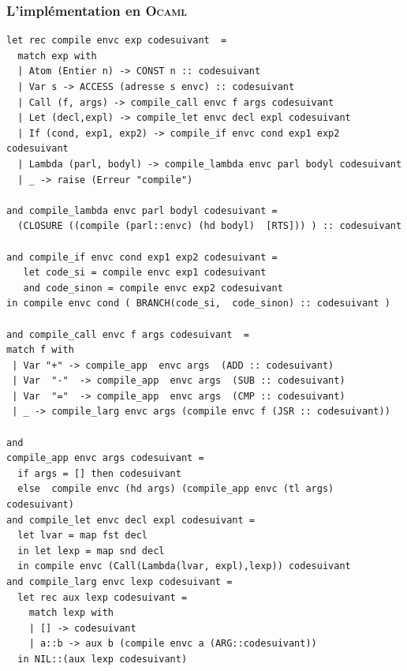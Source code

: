 \subsubsection{L'implémentation en \textsc{Ocaml}}

\begin{footnotesize}
\begin{Verbatim}
let rec compile envc exp codesuivant  =
  match exp with
  | Atom (Entier n) -> CONST n :: codesuivant
  | Var s -> ACCESS (adresse s envc) :: codesuivant
  | Call (f, args) -> compile_call envc f args codesuivant
  | Let (decl,expl) -> compile_let envc decl expl codesuivant 
  | If (cond, exp1, exp2) -> compile_if envc cond exp1 exp2 codesuivant
  | Lambda (parl, bodyl) -> compile_lambda envc parl bodyl codesuivant
  | _ -> raise (Erreur "compile")

and compile_lambda envc parl bodyl codesuivant =
  (CLOSURE ((compile (parl::envc) (hd bodyl)  [RTS])) ) :: codesuivant 

and compile_if envc cond exp1 exp2 codesuivant =
   let code_si = compile envc exp1 codesuivant
   and code_sinon = compile envc exp2 codesuivant
in compile envc cond ( BRANCH(code_si,  code_sinon) :: codesuivant ) 

and compile_call envc f args codesuivant  =
match f with 
 | Var "+" -> compile_app  envc args  (ADD :: codesuivant)
 | Var  "-"  -> compile_app  envc args  (SUB :: codesuivant)
 | Var  "="  -> compile_app  envc args  (CMP :: codesuivant)
 | _ -> compile_larg envc args (compile envc f (JSR :: codesuivant))
 
and
compile_app envc args codesuivant =
  if args = [] then codesuivant
  else  compile envc (hd args) (compile_app envc (tl args) codesuivant) 
and compile_let envc decl expl codesuivant =
  let lvar = map fst decl
  in let lexp = map snd decl
  in compile envc (Call(Lambda(lvar, expl),lexp)) codesuivant 
and compile_larg envc lexp codesuivant =
  let rec aux lexp codesuivant =
    match lexp with
    | [] -> codesuivant
    | a::b -> aux b (compile envc a (ARG::codesuivant))
  in NIL::(aux lexp codesuivant)
    

\end{Verbatim}
\end{footnotesize}
